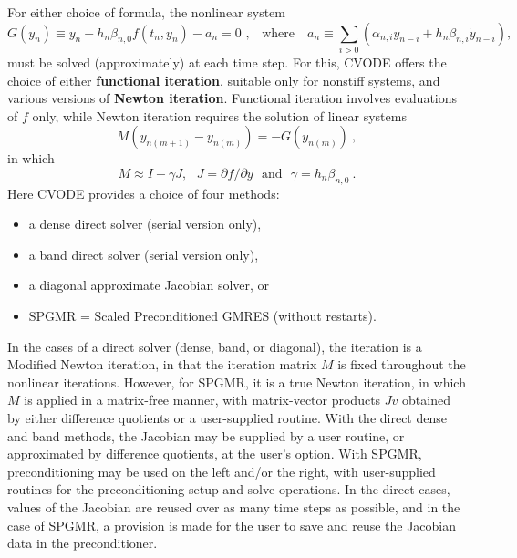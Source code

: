For either choice of formula, the nonlinear system
\begin{equation}
G(y_n) \equiv y_n - h_n \beta_{n,0} f(t_n,y_n) - a_n = 0
  \mbox{~,~~~where~~~} a_n \equiv  
  \sum_{i>0}(\alpha_{n,i} y_{n-i} + h_n \beta_{n,i} \dot{y}_{n-i}),
\label{NLS} \end{equation}
must be solved (approximately) at each time step.  For this, CVODE
offers the choice of either {\bf functional iteration}, suitable only
for nonstiff systems, and various versions of {\bf Newton iteration}.
Functional iteration involves evaluations of $f$ only, while Newton
iteration requires the solution of linear systems
\begin{equation} M (y_{n(m+1)} - y_{n(m)}) = -G(y_{n(m)}) ~,
\label{Newtoncorr} \end{equation}
in which
\begin{equation} M \approx I - \gamma J, ~~~J = \partial f / \partial y 
                 ~~~ \mbox{and} ~~~\gamma = h_n \beta_{n,0} ~. 
\label{Newtonmat} \end{equation}
Here CVODE provides a choice of four methods:
\vspace*{-.19in}
\begin{itemize}
\item a dense direct solver (serial version only),
\item a band direct solver (serial version only),
\item a diagonal approximate Jacobian solver, or
\item SPGMR = Scaled Preconditioned GMRES (without restarts).
\end{itemize}
In the cases of a direct solver (dense, band, or diagonal), the
iteration is a Modified Newton iteration, in that the iteration matrix
$M$ is fixed throughout the nonlinear iterations.  However, for SPGMR,
it is a true Newton iteration, in which $M$ is applied in a
matrix-free manner, with matrix-vector products $Jv$ obtained by
either difference quotients or a user-supplied routine.  With the
direct dense and band methods, the Jacobian may be supplied by a user
routine, or approximated by difference quotients, at the user's
option.  With SPGMR, preconditioning may be used on the left and/or
the right, with user-supplied routines for the preconditioning setup
and solve operations.  In the direct cases, values of the Jacobian are
reused over as many time steps as possible, and in the case of SPGMR,
a provision is made for the user to save and reuse the Jacobian data
in the preconditioner.

